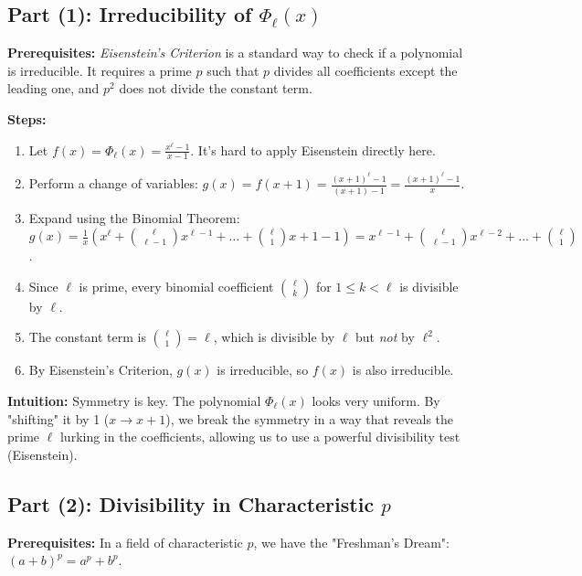 \begin{solution}
\subsection*{Part (1): Irreducibility of $\Phi_\ell(x)$}

\textbf{Prerequisites:} 
\textit{Eisenstein's Criterion} is a standard way to check if a polynomial is irreducible. It requires a prime $p$ such that $p$ divides all coefficients except the leading one, and $p^2$ does not divide the constant term.

\textbf{Steps:}
\begin{enumerate}
    \item Let $f(x) = \Phi_\ell(x) = \frac{x^\ell - 1}{x - 1}$. It's hard to apply Eisenstein directly here.
    \item Perform a change of variables: $g(x) = f(x+1) = \frac{(x+1)^\ell - 1}{(x+1) - 1} = \frac{(x+1)^\ell - 1}{x}$.
    \item Expand using the Binomial Theorem: $g(x) = \frac{1}{x} \left( x^\ell + \binom{\ell}{\ell-1}x^{\ell-1} + \dots + \binom{\ell}{1}x + 1 - 1 \right) = x^{\ell-1} + \binom{\ell}{\ell-1}x^{\ell-2} + \dots + \binom{\ell}{1}$.
    \item Since $\ell$ is prime, every binomial coefficient $\binom{\ell}{k}$ for $1 \leq k < \ell$ is divisible by $\ell$.
    \item The constant term is $\binom{\ell}{1} = \ell$, which is divisible by $\ell$ but \textit{not} by $\ell^2$.
    \item By Eisenstein's Criterion, $g(x)$ is irreducible, so $f(x)$ is also irreducible.
\end{enumerate}

\textbf{Intuition:}
Symmetry is key. The polynomial $\Phi_\ell(x)$ looks very uniform. By "shifting" it by 1 ($x \to x+1$), we break the symmetry in a way that reveals the prime $\ell$ lurking in the coefficients, allowing us to use a powerful divisibility test (Eisenstein).

\par\vspace{1.5em}

\subsection*{Part (2): Divisibility in Characteristic $p$}

\textbf{Prerequisites:} 
In a field of characteristic $p$, we have the "Freshman's Dream": $(a+b)^p = a^p + b^p$.


\end{solution}
